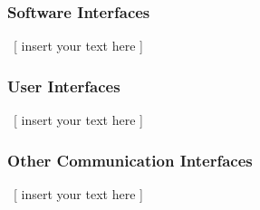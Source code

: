 \documentclass[twoside,letterpaper]{article}
\begin{document}
\subsubsection[Software Interfaces]{\rmfamily\bfseries\color{black} Software Interfaces}
\hypertarget{RefHeading21059017292}{}{\color{black}
\foreignlanguage{english}{\ [ insert your text here ]}}

\subsubsection[User Interfaces]{\rmfamily\bfseries\color{black} User Interfaces}
\hypertarget{RefHeading21259017292}{}{\color{black}
\foreignlanguage{english}{\ [ insert your text here ]}}

\subsubsection[Other Communication Interfaces]{\rmfamily\bfseries\color{black} Other
Communication Interfaces}
\hypertarget{RefHeading21459017292}{}{\color{black}
\foreignlanguage{english}{\ [ insert your text here ]}}


\bigskip


\bigskip

\bigskip
\clearpage\setcounter{page}{1}\pagestyle{Convertiv}

\bigskip
\end{document}
